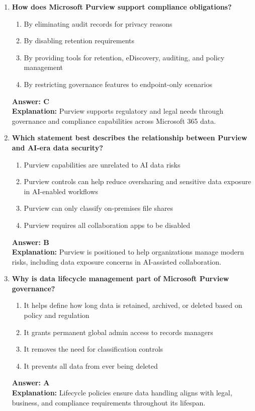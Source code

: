 \documentclass[10pt]{article}
\begin{document}
\begin{enumerate}[leftmargin=*]
\item \textbf{How does Microsoft Purview support compliance obligations?}
\begin{enumerate}[label=\Alph*.]
  \item By eliminating audit records for privacy reasons
  \item By disabling retention requirements
  \item By providing tools for retention, eDiscovery, auditing, and policy management
  \item By restricting governance features to endpoint-only scenarios
\end{enumerate}
\textbf{Answer: C}\\
\textbf{Explanation:} Purview supports regulatory and legal needs through governance and compliance capabilities across Microsoft 365 data.

\item \textbf{Which statement best describes the relationship between Purview and AI-era data security?}
\begin{enumerate}[label=\Alph*.]
  \item Purview capabilities are unrelated to AI data risks
  \item Purview controls can help reduce oversharing and sensitive data exposure in AI-enabled workflows
  \item Purview can only classify on-premises file shares
  \item Purview requires all collaboration apps to be disabled
\end{enumerate}
\textbf{Answer: B}\\
\textbf{Explanation:} Purview is positioned to help organizations manage modern risks, including data exposure concerns in AI-assisted collaboration.

\item \textbf{Why is data lifecycle management part of Microsoft Purview governance?}
\begin{enumerate}[label=\Alph*.]
  \item It helps define how long data is retained, archived, or deleted based on policy and regulation
  \item It grants permanent global admin access to records managers
  \item It removes the need for classification controls
  \item It prevents all data from ever being deleted
\end{enumerate}
\textbf{Answer: A}\\
\textbf{Explanation:} Lifecycle policies ensure data handling aligns with legal, business, and compliance requirements throughout its lifespan.


\end{enumerate}
\end{document}
